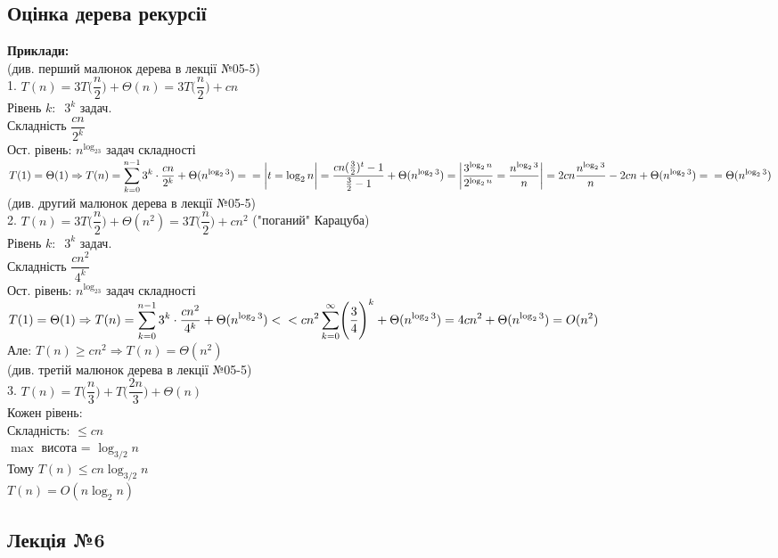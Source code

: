\documentclass[a4paper,12pt]{article}
\newcommand{\dsum}{\displaystyle\sum}
\begin{document}
\newpage
    \subsection{Оцінка дерева рекурсії}
    \textbf{Приклади:} \\
    (див. перший малюнок дерева в лекції №05-5) \\
    1. $T(n)=3T\Biggl(\dfrac{n}{2}\Biggr)+\Theta(n)=3T\Biggl(\dfrac{n}{2}\Biggr)+cn$ \\
    Рівень $k:\:$ $3^k$ задач. \\
    Складність $\dfrac{cn}{2^k}$ \\
    Ост. рівень: $n^{\log_23}$ задач складності $T(1)=\Theta(1)\Rightarrow T(n)=\dsum\limits_{k=0}^{n-1}3^k\cdot\dfrac{cn}{2^k}+\Theta(n^{\log_23})=\\=\bigg|t=\log_2n\bigg|=
    \dfrac{cn(\frac{3}{2})^t-1}{\frac{3}{2}-1}+\Theta(n^{\log_23})=\bigg|\dfrac{3^{\log_2n}}{2^{\log_2n}}=\dfrac{n^{\log_23}}{n}\bigg|=2cn\dfrac{n^{\log_23}}{n}-2cn+\Theta(n^{\log_23})=\\=
    \Theta(n^{\log_23})$ \\
    (див. другий малюнок дерева в лекції №05-5) \\
    2. $T(n)=3T\Biggl(\dfrac{n}{2}\Biggr)+\Theta(n^2)=3T\Biggl(\dfrac{n}{2}\Biggr)+cn^2$ ("поганий" Карацуба) \\
    Рівень $k:\:$ $3^k$ задач. \\
    Складність $\dfrac{cn^2}{4^k}$ \\
    Ост. рівень: $n^{\log_23}$ задач складності $T(1)=\Theta(1)\Rightarrow T(n)=\dsum\limits_{k=0}^{n-1}3^k\cdot\dfrac{cn^2}{4^k}+\Theta(n^{\log_23})<\\<
    cn^2\dsum\limits_{k=0}^{\infty}\Biggl(\dfrac{3}{4}\Biggr)^k+\Theta(n^{\log_23})=4cn^2+\Theta(n^{\log_23})=O(n^2)$ \\
    Але: $T(n)\geqslant cn^2\Rightarrow T(n)=\Theta(n^2)$ \\
    (див. третій малюнок дерева в лекції №05-5) \\
    3. $T(n)=T\Biggl(\dfrac{n}{3}\Biggr)+T\Biggl(\dfrac{2n}{3}\Biggr)+\Theta(n)$ \\
    Кожен рівень: \\
    Складність: $\leqslant cn$ \\
    $\max$ висота = $\log_{3/2}n$ \\
    Тому $T(n)\leqslant cn\log_{3/2}n$ \\
    $T(n)=O(n\log_2n)$

\newpage
    \begin{center}
        \hrulefill
        \section{Лекція №6}
        \hrulefill
    \end{center}
\end{document}
